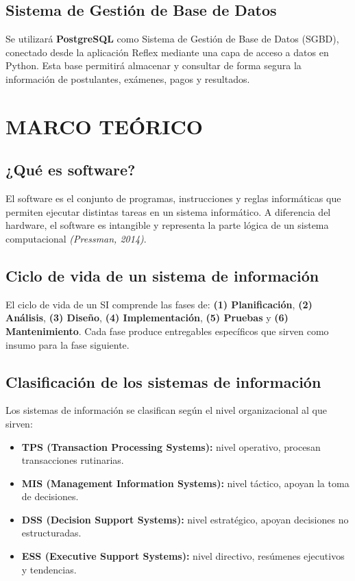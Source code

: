 \documentclass[12pt, a4paper]{report}
\begin{document}
\subsection{Sistema de Gestión de Base de Datos}

Se utilizará \textbf{PostgreSQL} como Sistema de Gestión de Base de Datos (SGBD), conectado desde la aplicación Reflex mediante una capa de acceso a datos en Python. Esta base permitirá almacenar y consultar de forma segura la información de postulantes, exámenes, pagos y resultados.

\section{MARCO TEÓRICO}

\subsection{¿Qué es software?}

El software es el conjunto de programas, instrucciones y reglas informáticas que permiten ejecutar distintas tareas en un sistema informático. A diferencia del hardware, el software es intangible y representa la parte lógica de un sistema computacional \textit{(Pressman, 2014)}.

\subsection{Ciclo de vida de un sistema de información}

El ciclo de vida de un SI comprende las fases de: \textbf{(1) Planificación}, \textbf{(2) Análisis}, \textbf{(3) Diseño}, \textbf{(4) Implementación}, \textbf{(5) Pruebas} y \textbf{(6) Mantenimiento}. Cada fase produce entregables específicos que sirven como insumo para la fase siguiente.

\subsection{Clasificación de los sistemas de información}

Los sistemas de información se clasifican según el nivel organizacional al que sirven:

\begin{itemize}[noitemsep]
  \item \textbf{TPS (Transaction Processing Systems):} nivel operativo, procesan transacciones rutinarias.
  \item \textbf{MIS (Management Information Systems):} nivel táctico, apoyan la toma de decisiones.
  \item \textbf{DSS (Decision Support Systems):} nivel estratégico, apoyan decisiones no estructuradas.
  \item \textbf{ESS (Executive Support Systems):} nivel directivo, resúmenes ejecutivos y tendencias.
\end{itemize}
\end{document}

